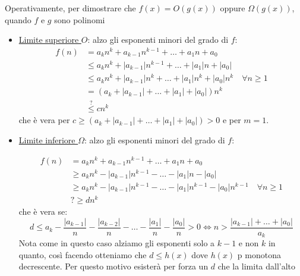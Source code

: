 Operativamente, per dimostrare che $ f\left(x\right) =  O\left(g\left(x\right)\right) $ oppure $ \Omega\left(g\left(x\right)\right)  $, quando $ f $ e $ g $ sono polinomi
\begin{itemize}
	\item \underline{Limite superiore $ O $}: alzo gli esponenti minori del grado di $ f $:
	      \[
		      \begin{aligned}
			      f(n) & =a_k n^k+a_{k-1} n^{k-1}+\ldots+a_1 n+a_0                                                                     \\
			           & \leq a_k n^k+\left|a_{k-1}\right| n^{k-1}+\ldots+\left|a_1\right| n+\left|a_0\right|                          \\
			           & \leq a_k n^k+\left|a_{k-1}\right| n^k+\ldots+\left|a_1\right| n^k+\left|a_0\right| n^k \quad \forall n \geq 1 \\
			           & =\left(a_k+\left|a_{k-1}\right|+\ldots+\left|a_1\right|+\left|a_0\right|\right) n^k                           \\
			           & \stackrel{?}{\leq} c n^k
		      \end{aligned}
	      \]
	      che è vera per $c \geq\left(a_k+\left|a_{k-1}\right|+\ldots+\left|a_1\right|+\left|a_0\right|\right)>0$ e per $m=1$.

	\item \underline{Limite inferiore $ \Omega  $}: alzo gli esponenti minori del grado di $ f $:

	      \[
		      \begin{aligned}
			      f(n) & =a_k n^k+a_{k-1} n^{k-1}+\ldots+a_1 n+a_0                                                                                 \\
			           & \geq a_k n^k-\left|a_{k-1}\right| n^{k-1}-\ldots-\left|a_1\right| n-\left|a_0\right|                                      \\
			           & \geq a_k n^k-\left|a_{k-1}\right| n^{k-1}-\ldots-\left|a_1\right| n^{k-1}-\left|a_0\right| n^{k-1} \quad \forall n \geq 1 \\
			           & ? \geq d n^k
		      \end{aligned}
	      \]
	      che è vera se:
	      \[
		      d \leq a_k-\frac{\left|a_{k-1}\right|}{n}-\frac{\left|a_{k-2}\right|}{n}-\ldots-\frac{\left|a_1\right|}{n}-\frac{\left|a_0\right|}{n}>0 \Leftrightarrow n>\frac{\left|a_{k-1}\right|+\ldots+\left|a_0\right|}{a_k}
	      \]
	      Nota come in questo caso alziamo gli esponenti solo a $ k-1 $ e non $ k $ in quanto, così facendo otteniamo che $ d \le h\left(x\right) $ dove $ h\left(x\right) $ p monotona decrescente. Per questo motivo esisterà per forza un $ d $ che la limita dall'alto

\end{itemize}


